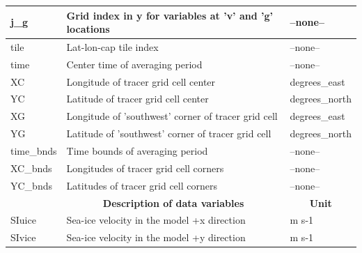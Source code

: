 \begin{longtable}{|m{}|m{}|m{}|}
j\_g &Grid index in y for variables at 'v' and 'g' locations &--none--  \\ \hline
tile &Lat-lon-cap tile index &--none--  \\ \hline
time &Center time of averaging period &--none--  \\ \hline
XC &Longitude of tracer grid cell center &degrees\_east  \\ \hline
YC &Latitude of tracer grid cell center &degrees\_north  \\ \hline
XG &Longitude of 'southwest' corner of tracer grid cell &degrees\_east  \\ \hline
YG &Latitude of 'southwest' corner of tracer grid cell &degrees\_north  \\ \hline
time\_bnds &Time bounds of averaging period &--none--  \\ \hline
XC\_bnds &Longitudes of tracer grid cell corners &--none--  \\ \hline
YC\_bnds &Latitudes of tracer grid cell corners &--none--  \\ \hline
\rowcolor{lightgray} \multicolumn{1}{|c|}{\textbf{Variables}} & \multicolumn{1}{|c|}{\textbf{Description of data variables}} &  \multicolumn{1}{|c|}{\textbf{Unit}}\\ \hline
SIuice &Sea-ice velocity in the model +x direction  &m s-1  \\ \hline
SIvice &Sea-ice velocity in the model +y direction  &m s-1  \\ \hline
\end{longtable}

\newp
\pagebreak

